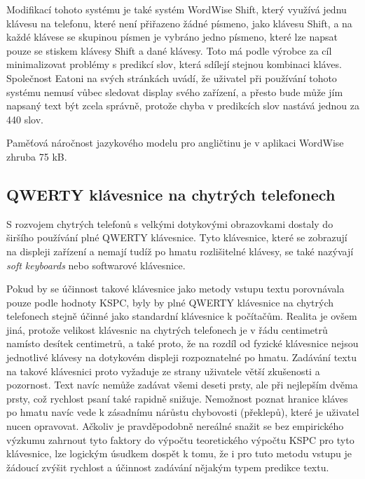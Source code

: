 \documentclass[a4paper,11pt]{article}
\begin{document}
Modifikací tohoto systému je také systém WordWise Shift, který využívá jednu klávesu na telefonu, které není přiřazeno žádné písmeno, jako klávesu Shift, a na každé klávese se skupinou písmen je vybráno jedno písmeno, které lze napsat pouze se stiskem klávesy Shift a dané klávesy. Toto má podle výrobce za cíl minimalizovat problémy s predikcí slov, která sdílejí stejnou kombinaci kláves. Společnost Eatoni na svých stránkách uvádí, že uživatel při používání tohoto systému nemusí vůbec sledovat display svého zařízení, a přesto bude může jím napsaný text být zcela správně, protože chyba v predikcích slov nastává jednou za 440 slov. \cite{Ward2012}

Paměťová náročnost jazykového modelu pro angličtinu je v aplikaci WordWise zhruba 75 kB. %

\subsection{QWERTY klávesnice na chytrých telefonech}

S rozvojem chytrých telefonů s velkými dotykovými obrazovkami dostaly do širšího používání plné QWERTY klávesnice. Tyto klávesnice, které se zobrazují na displeji zařízení a nemají tudíž po hmatu rozlišitelné klávesy, se také nazývají {\it soft keyboards} nebo softwarové klávesnice.

Pokud by se účinnost takové klávesnice jako metody vstupu textu porovnávala pouze podle hodnoty KSPC, byly by plné QWERTY klávesnice na chytrých telefonech stejně účinné jako standardní klávesnice k počítačům. Realita je ovšem jiná, protože velikost klávesnic na chytrých telefonech je v řádu centimetrů namísto desítek centimetrů, a také proto, že na rozdíl od fyzické klávesnice nejsou jednotlivé klávesy na dotykovém displeji rozpoznatelné po hmatu. Zadávání textu na takové klávesnici proto vyžaduje ze strany uživatele větší zkušenosti a pozornost. Text navíc nemůže zadávat všemi deseti prsty, ale při nejlepším dvěma prsty, což rychlost psaní také rapidně snižuje. Nemožnost poznat hranice kláves po hmatu navíc vede k zásadnímu nárůstu chybovosti (překlepů), které je uživatel nucen opravovat. Ačkoliv je pravděpodobně nereálné snažit se bez empirického výzkumu zahrnout tyto faktory do výpočtu teoretického výpočtu KSPC pro tyto klávesnice, lze logickým úsudkem dospět k tomu, že i pro tuto metodu vstupu je žádoucí zvýšit rychlost a účinnost zadávání nějakým typem predikce textu.
\end{document}
